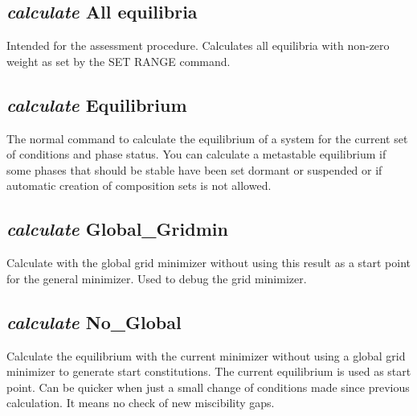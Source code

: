 \documentclass[12pt]{article}
\begin{document}
\subsection{{\em calculate} All equilibria}

Intended for the assessment procedure.  Calculates all equilibria with
non-zero weight as set by the SET RANGE command.

\subsection{{\em calculate} Equilibrium}

The normal command to calculate the equilibrium of a system for the
current set of conditions and phase status.  You can calculate a
metastable equilibrium if some phases that should be stable have been
set dormant or suspended or if automatic creation of composition sets
is not allowed.

\subsection{{\em calculate} Global\_Gridmin}

Calculate with the global grid minimizer without using this result as a
start point for the general minimizer.  Used to debug the grid
minimizer.

\subsection{{\em calculate} No\_Global}

Calculate the equilibrium with the current minimizer without using a
global grid minimizer to generate start constitutions.  The current
equilibrium is used as start point.  Can be quicker when just a small
change of conditions made since previous calculation.  It means no
check of new miscibility gaps.
\end{document}

